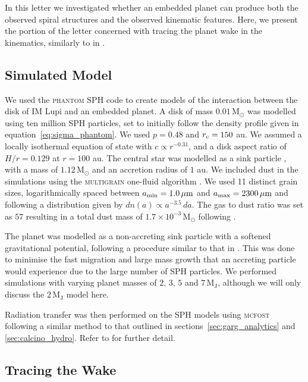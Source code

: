 In this letter we investigated whether an embedded planet can produce both the observed spiral structures and the observed kinematic features.
Here, we present the portion of the letter concerned with tracing the planet wake in the kinematics, similarly to in \citet{calcino2022}.

\subsection{Simulated Model}

We used the \textsc{phantom} SPH code \citep{price2018} to create models of the interaction between the disk of IM Lupi and an embedded planet.
A disk of mass $0.01 \, \mathrm{M_\odot}$ was modelled using ten million SPH particles, set to initially follow the density profile given in equation~\ref{eq:sigma_phantom}.
We used $p=0.48$ \citep{pinte2018} and $r_{\rm c}=150$ au.
We assumed a locally isothermal equation of state with $c \propto r^{-0.31}$, and a disk aspect ratio of $H/r=0.129$ at $r=100$ au.
The central star was modelled as a sink particle \citep{bate1995}, with a mass of $1.12 \, \mathrm{M_\odot}$ \citep{andrews2018} and an accretion radius of $1$ au.
We included dust in the simulations using the \textsc{multigrain} one-fluid algorithm \citep{price2015,ballabio2018,hutchison2018,price2018}.
We used 11 distinct grain sizes, logarithmically spaced between $a_{\rm min}=1.0 \, \mathrm{\mu m}$ and $a_{\rm max}=2300 \, \mathrm{\mu m}$ and following a distribution given by $dn(a) \propto a^{-3.5} \, da$.
The gas to dust ratio was set as $57$ resulting in a total dust mass of $1.7 \times 10^{-3} \, \mathrm{M_\odot}$ following \citep{pinte2018}. 

The planet was modelled as a non-accreting sink particle with a softened gravitational potential, following a procedure similar to that in \citet{szulagyi2016}.
This was done to minimise the fast migration and large mass growth that an accreting particle would experience due to the large number of SPH particles.
We performed simulations with varying planet masses of $2, \, 3, \, 5$ and $7\, \mathrm{M_J}$, although we will only discuss the $2 \, \mathrm{M_J}$ model here.

Radiation transfer was then performed on the SPH models using \textsc{mcfost} \citep{pinte2006,pinte2009} following a similar method to that outlined in sections~\ref{sec:garg_analytics} and \ref{sec:calcino_hydro}.
Refer to \citet{verrios2022} for further detail.

\subsection{Tracing the Wake}

